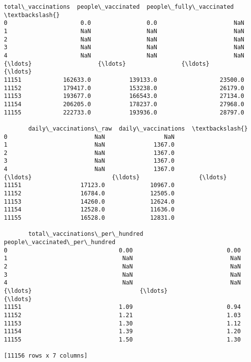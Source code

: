 \documentclass[11pt]{article}
\makeatletter
\newcommand{\boxspacing}{\kern\kvtcb@left@rule\kern\kvtcb@boxsep}
\newcommand{\prompt}[4]{
        {\ttfamily\llap{{\color{#2}[#3]:\hspace{3pt}#4}}\vspace{-\baselineskip}}
    }
\makeatother
\begin{document}
            \begin{tcolorbox}[breakable, size=fbox, boxrule=.5pt, pad at break*=1mm, opacityfill=0]
\prompt{Out}{outcolor}{32}{\boxspacing}
\begin{Verbatim}[commandchars=\\\{\}]
       total\_vaccinations  people\_vaccinated  people\_fully\_vaccinated  \textbackslash{}
0                     0.0                0.0                      NaN
1                     NaN                NaN                      NaN
2                     NaN                NaN                      NaN
3                     NaN                NaN                      NaN
4                     NaN                NaN                      NaN
{\ldots}                   {\ldots}                {\ldots}                      {\ldots}
11151            162633.0           139133.0                  23500.0
11152            179417.0           153238.0                  26179.0
11153            193677.0           166543.0                  27134.0
11154            206205.0           178237.0                  27968.0
11155            222733.0           193936.0                  28797.0

       daily\_vaccinations\_raw  daily\_vaccinations  \textbackslash{}
0                         NaN                 NaN
1                         NaN              1367.0
2                         NaN              1367.0
3                         NaN              1367.0
4                         NaN              1367.0
{\ldots}                       {\ldots}                 {\ldots}
11151                 17123.0             10967.0
11152                 16784.0             12505.0
11153                 14260.0             12624.0
11154                 12528.0             11636.0
11155                 16528.0             12831.0

       total\_vaccinations\_per\_hundred  people\_vaccinated\_per\_hundred
0                                0.00                           0.00
1                                 NaN                            NaN
2                                 NaN                            NaN
3                                 NaN                            NaN
4                                 NaN                            NaN
{\ldots}                               {\ldots}                            {\ldots}
11151                            1.09                           0.94
11152                            1.21                           1.03
11153                            1.30                           1.12
11154                            1.39                           1.20
11155                            1.50                           1.30

[11156 rows x 7 columns]
\end{Verbatim}
\end{tcolorbox}
        
\end{document}
